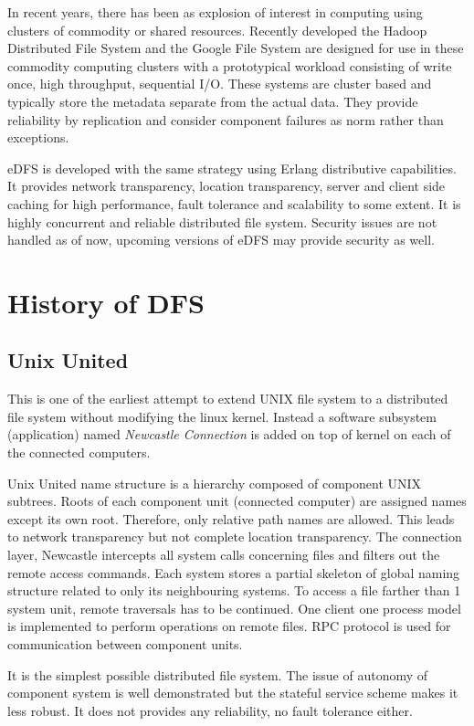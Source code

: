 \documentclass[a4paper,12pt]{article}
\begin{document}
In recent years, there has been as explosion of interest in computing using clusters of commodity or shared resources. Recently developed the Hadoop Distributed File System \cite{hadoop} and the Google File System \cite{ghemawat03} are designed for use in these commodity computing clusters with a prototypical workload consisting of write once, high throughput, sequential I/O. These systems are cluster based and typically store the metadata separate from the actual data. They provide reliability by replication and consider component failures as norm rather than exceptions.

eDFS is developed with the same strategy using Erlang distributive capabilities. It provides network transparency, location transparency, server and client side caching for high performance, fault tolerance and scalability to some extent. It is highly concurrent and reliable distributed file system. Security issues are not handled as of now, upcoming versions of eDFS may provide security as well.

\section{History of DFS}
\subsection{Unix United \cite[p.~342]{old_dfs}}
This is one of the earliest attempt to extend UNIX file system to a distributed file system without modifying the linux kernel. Instead a software subsystem (application) named \textit{Newcastle Connection} is added on top of kernel on each of the connected computers. 

Unix United name structure is a hierarchy composed of component UNIX subtrees. Roots of each component unit (connected computer) are assigned names except its own root. Therefore, only relative path names are allowed. This leads to network transparency but not complete location transparency. The connection layer, Newcastle intercepts all system calls concerning files and filters out the remote access commands. Each system stores a partial skeleton of global naming structure related to only its neighbouring systems. To access a file farther than 1 system unit, remote traversals has to be continued.  One client one process model is implemented to perform operations on remote files. RPC protocol is used for communication between component units. 

It is the simplest possible distributed file system. The issue of autonomy of component system is well demonstrated but the stateful service scheme makes it less robust. It does not provides any reliability, no fault tolerance either.
\end{document}
